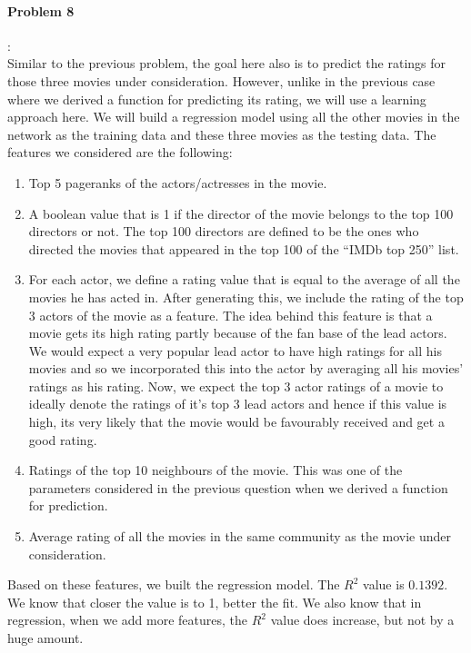 \documentclass{article}
\begin{document}
\paragraph{Problem 8}:\\
Similar to the previous problem, the goal here also is to predict the ratings for those three movies under consideration.
However, unlike in the previous case where we derived a function for predicting its rating, we will use a learning 
approach here. We will build a regression model using all the other movies in the network as the training data and these three
movies as the testing data. The features we considered are the following:
\begin{enumerate}
 \item 
 Top 5 pageranks of the actors/actresses in the movie.
 \item
 A boolean value that is 1 if the director of the movie belongs to the top 100 directors or not. The top 100 directors
 are defined to be the ones who directed the movies that appeared in the top 100 of the ``IMDb top 250'' list.
 \item
 For each actor, we define a rating value that is equal to the average of all the movies he has acted in. After generating this,
 we include the rating of the top 3 actors of the movie as a feature. The idea behind this feature is that a movie gets its
 high rating partly because of the fan base of the lead actors. We would expect a very popular lead actor to have high ratings
 for all his movies and so we incorporated this into the actor by averaging all his movies' ratings as his rating. Now, we expect
 the top 3 actor ratings of a movie to ideally denote the ratings of it's top 3 lead actors and hence if this value is high, its
 very likely that the movie would be favourably received and get a good rating. 
 \item
 Ratings of the top 10 neighbours of the movie. This was one of the parameters considered
 in the previous question when we derived a function for prediction.
 \item
 Average rating of all the movies in the same community as the movie under consideration.
\end{enumerate}
Based on these features, we built the regression model. The $R^2$ value is $0.1392$. We know that closer the value is to 1,
better the fit. We also know that in regression, when we add more features, the $R^2$ value does increase, but not by a huge amount.\\
\end{document}
